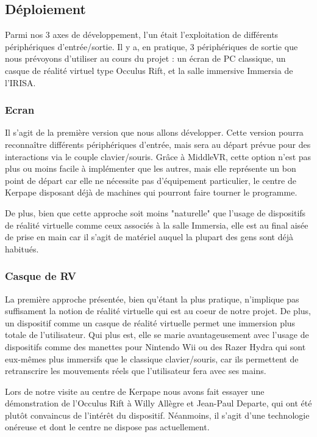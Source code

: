 \subsection{Déploiement}
Parmi nos 3 axes de développement, l'un était l'exploitation de différents périphériques d'entrée/sortie. Il y a, en pratique, 3 périphériques de sortie que nous prévoyons d'utiliser au cours du projet : un écran de PC classique, un casque de réalité virtuel type Occulus Rift, et la salle immersive Immersia de l'IRISA. 

\subsubsection{Ecran}
Il s'agit de la première version que nous allons développer. Cette version pourra reconnaître différents périphériques d'entrée, mais sera au départ prévue pour des interactions via le couple clavier/souris. Grâce à MiddleVR, cette option n'est pas plus ou moins facile à implémenter que les autres, mais elle représente un bon point de départ car elle ne nécessite pas d'équipement particulier, le centre de Kerpape disposant déjà de machines qui pourront faire tourner le programme. \newline

De  plus, bien que cette approche soit moins "naturelle" que l'usage de dispositifs de réalité virtuelle comme ceux associés à la salle Immersia, elle est au final aisée de prise en main car il s'agit de matériel auquel la plupart des gens sont déjà habitués. 

\subsubsection{Casque de RV}
La première approche présentée, bien qu'étant la plus pratique, n'implique pas suffisament la notion de réalité virtuelle qui est au coeur de notre projet. De plus, un dispositif comme un casque de réalité virtuelle permet une immersion plus totale de l'utilisateur. Qui plus est, elle se marie avantageusement avec l'usage de dispositifs comme des manettes pour Nintendo Wii ou des Razer Hydra qui sont eux-mêmes plus immersifs que le classique clavier/souris, car ils permettent de retranscrire les mouvements réels que l'utilisateur fera avec ses mains. \newline

Lors de notre visite au centre de Kerpape nous avons fait essayer une démonstration de l'Occulus Rift à Willy Allègre et Jean-Paul Departe, qui ont été plutôt convaincus de l'intérêt du dispositif. Néanmoins, il s'agit d'une technologie onéreuse et dont le centre ne dispose pas actuellement. 

